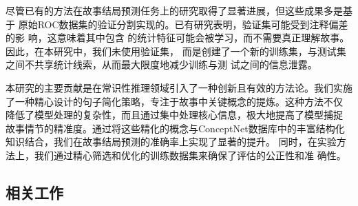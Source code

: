 


尽管已有的方法在故事结局预测任务上的研究取得了显著进展，但这些成果多是基于
原始ROC数据集的验证分割实现的。已有研究表明，验证集可能受到注释偏差的影
响\cite{gururangan2018annotation,sharma2018tackling}，这意味着其中包含
的统计特征可能会被学习，而不需要真正理解故事。因此，在本研究中，我们未使用验证集，
而是创建了一个新的训练集，与测试集之间不共享统计线索，从而最大限度地减少训练与测
试之间的信息泄露。

本研究的主要贡献是在常识性推理领域引入了一种创新且有效的方法论。我们实施
了一种精心设计的句子简化策略，专注于故事中关键概念的提炼。这种方法不仅
降低了模型处理的复杂性，而且通过集中处理核心信息，极大地提高了模型捕捉
故事情节的精准度。通过将这些精化的概念与ConceptNet数据库中的丰富结构化
知识结合，我们在故事结局预测的准确率上实现了显著的提升。
同时，在实验方法上，我们通过精心筛选和优化的训练数据集来确保了评估的公正性和准
确性。

\subsection{相关工作}
\label{sec2:related}

